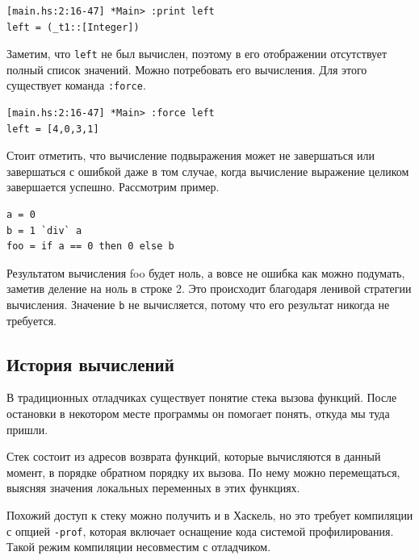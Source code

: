 \documentclass[fontsize=14pt, paper=a4, pagesize, DIV=calc]{scrartcl}
\def\code#1{\texttt{#1}}
\begin{document}
\begin{ListingEnv}
\caption{}
\begin{lstlisting}
[main.hs:2:16-47] *Main> :print left
left = (_t1::[Integer])
\end{lstlisting}
\end{ListingEnv}

Заметим, что \code{left} не был вычислен, поэтому в его отображении отсутствует
полный список значений. Можно потребовать его вычисления. Для этого существует
команда \code{:force}. 

\begin{ListingEnv}
\caption{}
\begin{lstlisting}
[main.hs:2:16-47] *Main> :force left
left = [4,0,3,1]
\end{lstlisting}
\end{ListingEnv}

Стоит отметить, что вычисление подвыражения может не завершаться или
завершаться с ошибкой даже в том случае, когда вычисление выражение целиком
завершается успешно. Рассмотрим пример.

\begin{ListingEnv}
\caption{main.hs}
\begin{lstlisting}
a = 0
b = 1 `div` a
foo = if a == 0 then 0 else b
\end{lstlisting}
\end{ListingEnv}

Результатом вычисления foo будет ноль, а вовсе не ошибка как можно подумать,
заметив деление на ноль в строке 2. Это происходит благодаря ленивой стратегии
вычисления. Значение \code{b} не вычисляется, потому что его результат
никогда не требуется. 

\subsection{История вычислений}

В традиционных отладчиках существует понятие стека вызова функций. После
остановки в некотором месте программы он помогает понять, откуда мы туда
пришли. 

Стек состоит из адресов возврата функций, которые вычисляются в данный момент,
в порядке обратном порядку их вызова. По нему можно перемещаться, выясняя
значения локальных переменных в этих функциях.

Похожий доступ к стеку можно получить и в Хаскель, но это требует компиляции с
опцией \code{-prof}, которая включает оснащение кода системой профилирования.
Такой режим компиляции несовместим с отладчиком. 
\end{document}
